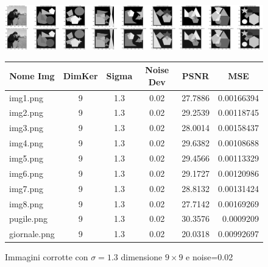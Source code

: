 \begin{figure}[H]
    \centering
    \begin{minipage}[h]{\textwidth}
    \includegraphics[width=\linewidth]{output/tabCorrotte/imgcorr11.png}\label{fig:imgcorrotte9x90.02}
    \end{minipage}
    \begin{minipage}[h]{\textwidth}
        \centering
        
        \begin{tabular}{|l c c c c r|}
            \hline
            \multicolumn{1}{|c}{\textbf{Nome Img}} & \multicolumn{1}{|c}{\textbf{DimKer}} & \multicolumn{1}{|c}{\textbf{Sigma}} & \multicolumn{1}{|c}{\textbf{Noise Dev}} & \multicolumn{1}{|c}{\textbf{PSNR}} & \multicolumn{1}{|c|}{\textbf{MSE}} \\ \hline
                img1.png & 9 & 1.3 & 0.02 & 27.7886 & 0.00166394 \\
                img2.png & 9 & 1.3 & 0.02 & 29.2539 & 0.00118745 \\
                img3.png & 9 & 1.3 & 0.02 & 28.0014 & 0.00158437 \\
                img4.png & 9 & 1.3 & 0.02 & 29.6382 & 0.00108688 \\
                img5.png & 9 & 1.3 & 0.02 & 29.4566 & 0.00113329 \\
                img6.png & 9 & 1.3 & 0.02 & 29.1727 & 0.00120986 \\
                img7.png & 9 & 1.3 & 0.02 & 28.8132 & 0.00131424 \\
                img8.png & 9 & 1.3 & 0.02 & 27.7142 & 0.00169269 \\
                pugile.png & 9 & 1.3 & 0.02 & 30.3576 & 0.0009209\\
                giornale.png & 9 & 1.3 & 0.02 & 20.0318 & 0.00992697 \\ \hline
            \end{tabular}\label{tab:tabcorrotte9x90.02}
        
        \end{minipage}
    \captionsetup{labelformat=andtable}
    \caption{Immagini corrotte con $\sigma = 1.3$ dimensione $9 \times 9$ e noise=0.02}
\end{figure}

